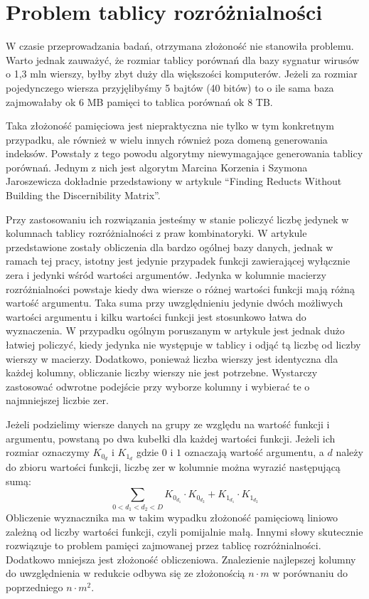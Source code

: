 \section{Problem tablicy rozróżnialności}

W czasie przeprowadzania badań,
otrzymana złożoność nie stanowiła problemu.
Warto jednak zauważyć,
że rozmiar tablicy porównań dla bazy sygnatur wirusów o 1,3 mln wierszy,
byłby zbyt duży dla większości komputerów.
Jeżeli za rozmiar pojedynczego wiersza przyjęlibyśmy 5 bajtów (40 bitów) to o ile sama baza zajmowałaby ok 6 MB pamięci to tablica porównań ok 8 TB.

Taka złożoność pamięciowa jest niepraktyczna nie tylko w tym konkretnym przypadku,
ale również w wielu innych również poza domeną generowania indeksów.
Powstały z tego powodu algorytmy niewymagające generowania tablicy porównań.
Jednym z nich jest algorytm Marcina Korzenia i Szymona Jaroszewicza dokładnie przedstawiony w artykule “Finding Reducts Without Building the Discernibility Matrix”.

Przy zastosowaniu ich rozwiązania jesteśmy w stanie policzyć liczbę jedynek w kolumnach tablicy rozróżnialności z praw kombinatoryki.
W artykule przedstawione zostały obliczenia dla bardzo ogólnej bazy danych,
jednak w ramach tej pracy,
istotny jest jedynie przypadek funkcji zawierającej wyłącznie zera i jedynki wśród wartości argumentów.
Jedynka w kolumnie macierzy rozróżnialności powstaje kiedy dwa wiersze o różnej wartości funkcji mają różną wartość argumentu.
Taka suma przy uwzględnieniu jedynie dwóch możliwych wartości argumentu i kilku wartości funkcji jest stosunkowo łatwa do wyznaczenia.
W przypadku ogólnym poruszanym w artykule jest jednak dużo łatwiej policzyć,
kiedy jedynka nie występuje w tablicy i odjąć tą liczbę od liczby wierszy w macierzy.
Dodatkowo,
ponieważ liczba wierszy jest identyczna dla każdej kolumny,
obliczanie liczby wierszy nie jest potrzebne.
Wystarczy zastosować odwrotne podejście przy wyborze kolumny i wybierać te o najmniejszej liczbie zer.

Jeżeli podzielimy wiersze danych na grupy ze względu na wartość funkcji i argumentu,
powstaną po dwa kubełki dla każdej wartości funkcji.
Jeżeli ich rozmiar oznaczymy $K_{0_d}$ i $K_{1_d}$ gdzie $0$ i $1$ oznaczają wartość argumentu,
a $d$ należy do zbioru wartości funkcji,
liczbę zer w kolumnie można wyrazić następującą sumą:
\begin{equation}
\sum_{0<d_1<d_2<D} K_{0_{d_1}} \cdot K_{0_{d_2}} + K_{1_{d_1}} \cdot K_{1_{d_2}}
\end{equation}
Obliczenie wyznacznika ma w takim wypadku złożoność pamięciową liniowo zależną od liczby wartości funkcji,
czyli pomijalnie małą.
Innymi słowy skutecznie rozwiązuje to problem pamięci zajmowanej przez tablicę rozróżnialności.
Dodatkowo mniejsza jest złożoność obliczeniowa.
Znalezienie najlepszej kolumny do uwzględnienia w redukcie odbywa się ze złożonością $n \cdot m$ w porównaniu do poprzedniego $n \cdot m^2$.

